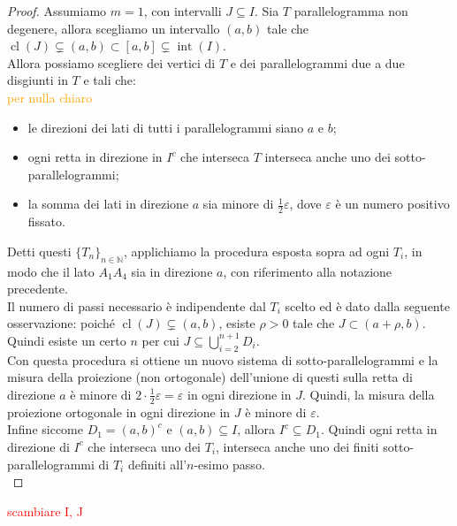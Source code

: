 \documentclass[a4paper, twoside,openright]{article}
\newcommand{\N}{\mathbb{N}}
\newcommand{\<}{\langle}
\renewcommand{\>}{\rangle}
\begin{document}
\begin{proof}
	Assumiamo $m=1$, con intervalli $J \subseteq I$. Sia $T$ parallelogramma non degenere, allora scegliamo un intervallo $(a, b)$ tale che $\operatorname{cl}(J) \subsetneq(a, b) \subset[a, b] \subsetneq \operatorname{int}(I)$.\\
	Allora possiamo scegliere dei vertici di $T$ e dei parallelogrammi due a due disgiunti in $T$ e tali che:\\
	\textcolor{orange}{per nulla chiaro}
		\begin{itemize}
		\item le direzioni dei lati di tutti i parallelogrammi siano $a$ e $b$;
		\item ogni retta in direzione in $I^c$ che interseca $T$ interseca anche uno dei sotto-parallelogrammi;
		\item la somma dei lati in direzione $a$ sia minore di $\frac{1}{2} \varepsilon$, dove $\varepsilon$ è un numero positivo fissato.
	\end{itemize}	
	Detti questi $\{T_n\}_{n \in \N}$, applichiamo la procedura esposta sopra ad ogni $T_i$, in modo che il lato $A_1A_4$ sia in direzione $a$, con riferimento alla notazione precedente.\\
	Il numero di passi necessario è indipendente dal $T_i$ scelto ed è dato dalla seguente osservazione: poiché $\operatorname{cl}(J) \subsetneq(a, b)$, esiste $\rho >0$ tale che $J \subset (a+\rho,b)$. Quindi esiste un certo $n$ per cui $J \subseteq \bigcup_{i=2}^{n+1}D_i$.\\
	Con questa procedura si ottiene un nuovo sistema di sotto-parallelogrammi e la misura della proiezione (non ortogonale) dell'unione di questi sulla retta di direzione $a$ è minore di $2 \cdot \frac{1}{2} \varepsilon=\varepsilon$ in ogni direzione in $J$. Quindi, la misura della proiezione ortogonale in ogni direzione in $J$ è minore di $\varepsilon$.\\
	Infine siccome $D_1 =(a,b)^c$ e $(a,b) \subseteq I$, allora $I^c \subseteq D_1$. Quindi ogni retta in direzione di $I^c$ che interseca uno dei $T_i$, interseca anche uno dei finiti sotto-parallelogrammi di $T_i$ definiti all'$n$-esimo passo.\\
\end{proof}
 \textcolor{red}{scambiare I, J}
\end{document}
